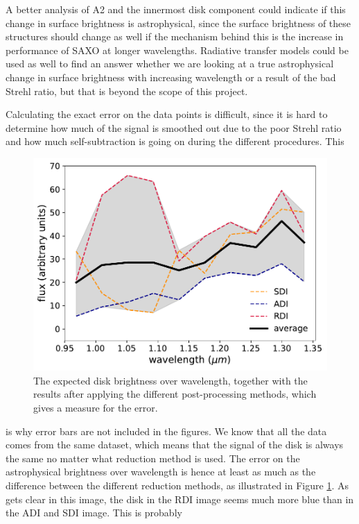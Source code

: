 \documentclass[twoside,single,12pt]{lion-msc}
\begin{document}
A better analysis of A2 and the innermost disk component could indicate if this change in surface brightness is astrophysical, since the surface brightness of these structures should change as well if the mechanism behind this is the increase in performance of SAXO at longer wavelengths. Radiative transfer models could be used as well to find an answer whether we are looking at a true astrophysical change in surface brightness with increasing wavelength or a result of the bad Strehl ratio, but that is beyond the scope of this project. 
\bigskip

Calculating the exact error on the data points is difficult, since it is hard to determine how much of the signal is smoothed out due to the poor Strehl ratio and how much self-subtraction is going on during the different procedures. This{\par}

\begin{figure}
\vspace{-6mm}
\centering
\includegraphics[width=0.85\linewidth]{totflux}
\caption{The expected disk brightness over wavelength, together with the results after applying the different post-processing methods, which gives a measure for the error.}
\label{fig:totflux}
\vspace*{-6mm}
\end{figure}

\noindent
 is why error bars are not included in the figures. We know that all the data comes from the same dataset, which means that the signal of the disk is always the same no matter what reduction method is used. The error on the astrophysical brightness over wavelength is hence at least as much as the difference between the different reduction methods, as illustrated in Figure \ref{fig:totflux}. As gets clear in this image, the disk in the RDI image seems much more blue than in the ADI and SDI image. This is probably{\par}
\bigskip
\end{document}
